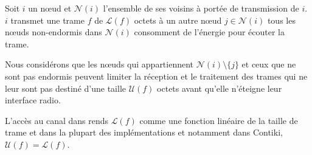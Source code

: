 




Soit $i$ un  nœud et $\mathcal{N}(i)$ l'ensemble de ses voisins à portée de transmission de $i$.
$i$ transmet une trame $f$ de  $\mathcal{L}(f)$ octets à un autre nœud $j \in \mathcal{N}(i)$ tous les nœuds non-endormis dans $\mathcal{N}(i)$ consomment de l'énergie pour écouter la trame.

Nous considérons que les  nœuds qui appartiennent $\mathcal{N}(i) \setminus \{j\}$ et ceux que ne sont pas endormis peuvent limiter la réception et le traitement des trames qui ne leur sont pas destiné d'une taille $\mathcal{U}(f)$ octets avant qu'elle n'éteigne leur interface radio.

L'accès au canal dans \ieee{} rends $\mathcal{L}(f)$ comme une fonction linéaire de la taille de trame et dans la plupart des implémentations et notamment dans Contiki, $\mathcal{U}(f) = \mathcal{L}(f)$.



